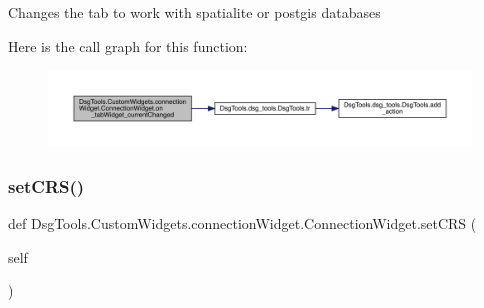 \begin{DoxyVerb}Changes the tab to work with spatialite or postgis databases
\end{DoxyVerb}
 Here is the call graph for this function\+:
\nopagebreak
\begin{figure}[H]
\begin{center}
\leavevmode
\includegraphics[width=350pt]{class_dsg_tools_1_1_custom_widgets_1_1connection_widget_1_1_connection_widget_a3d4a5a9dc4b87b4abffd9d41a7407a42_cgraph}
\end{center}
\end{figure}
\mbox{\label{class_dsg_tools_1_1_custom_widgets_1_1connection_widget_1_1_connection_widget_a33b3f9d4a7fa240bda00d7d874e7fa49}} 
\subsubsection{\texorpdfstring{set\+C\+R\+S()}{setCRS()}}
{\footnotesize\ttfamily def Dsg\+Tools.\+Custom\+Widgets.\+connection\+Widget.\+Connection\+Widget.\+set\+C\+RS (\begin{DoxyParamCaption}\item[{}]{self }\end{DoxyParamCaption})}

